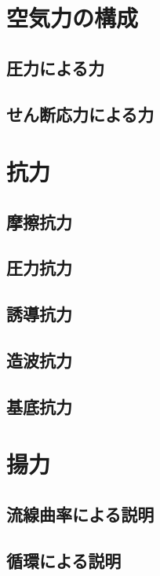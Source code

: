 \documentclass[uplatex,dvipdfmx,a4j,11pt]{jsreport}
\numberwithin{equation}{chapter}
\begin{document}
\section{空気力の構成}

\subsection{圧力による力}

\subsection{せん断応力による力}

\section{抗力}

\subsection{摩擦抗力}

\subsection{圧力抗力}

\subsection{誘導抗力}

\subsection{造波抗力}

\subsection{基底抗力}

\section{揚力}

\subsection{流線曲率による説明}

\subsection{循環による説明}
\end{document}
